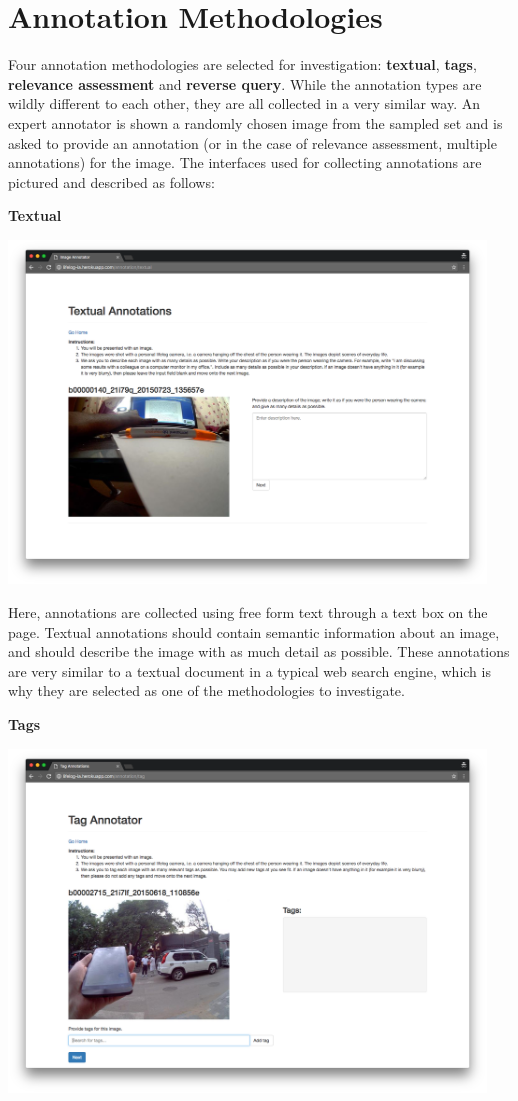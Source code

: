 \section{Annotation Methodologies}

Four annotation methodologies are selected for investigation: \textbf{textual}, \textbf{tags}, \textbf{relevance assessment} and \textbf{reverse query}. While the annotation types are wildly different to each other, they are all  collected in a very similar way. An expert annotator is shown a randomly chosen image from the sampled set and is asked to provide an annotation (or in the case of relevance assessment, multiple annotations) for the image. The interfaces used for collecting annotations are pictured and described as follows:

\textbf{Textual}

\includegraphics[width=0.95\textwidth]{images/text-interface}

Here, annotations are collected using free form text through a text box on the page. Textual annotations should contain semantic information about an image, and should describe the image with as much detail as possible. These annotations are very similar to a textual document in a typical web search engine, which is why they are selected as one of the methodologies to investigate.

\newpage
\textbf{Tags}

\includegraphics[width=0.95\textwidth]{images/tag-interface}

